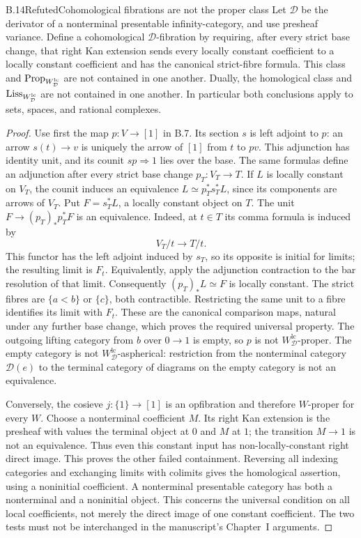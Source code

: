 \begin{claim}{B.14}{Refuted}{Cohomological fibrations are not the proper class}
Let $\mathcal D$ be the derivator of a nonterminal presentable
infinity-category, and use presheaf variance. Define a cohomological
$\mathcal D$-fibration by requiring, after every strict base change, that
right Kan extension sends every locally constant coefficient to a locally
constant coefficient and has the canonical strict-fibre formula.
This class and $\mathrm{Prop}_{W_{\mathcal D}^{\mathrm{lc}}}$ are not contained
in one another. Dually, the homological class and
$\mathrm{Liss}_{W_{\mathcal D}^{\mathrm{lc}}}$ are not contained in one another.
In particular both conclusions apply to sets, spaces, and rational complexes.
\end{claim}
\begin{proof}
Use first the map $p:V\to[1]$ in B.7. Its section $s$ is left adjoint to
$p$: an arrow $s(t)\to v$ is uniquely the arrow of $[1]$ from $t$ to $pv$.
This adjunction has identity unit, and its counit $sp\Rightarrow1$ lies
over the base. The same formulas define an adjunction after every strict
base change $p_T:V_T\to T$. If $L$ is locally constant on $V_T$, the
counit induces an equivalence $L\simeq p_T^*s_T^*L$, since its components
are arrows of $V_T$. Put $F=s_T^*L$, a locally constant object on $T$.
The unit $F\to(p_T)_*p_T^*F$ is an equivalence. Indeed, at $t\in T$
its comma formula is induced by
\[
 V_T/t\longrightarrow T/t.
\]
This functor has the left adjoint induced by $s_T$, so its opposite is
initial for limits; the resulting limit is $F_t$. Equivalently, apply
the adjunction contraction to the bar resolution of that limit.
Consequently $(p_T)_*L\simeq F$ is locally constant. The strict fibres
are $\{a<b\}$ or $\{c\}$, both contractible. Restricting the same
unit to a fibre identifies its limit with $F_t$. These are the canonical
comparison maps, natural under any further base change, which proves the
required universal property.
The outgoing lifting category from $b$ over $0\to1$ is empty, so $p$
is not $W_{\mathcal D}^{\mathrm{lc}}$-proper. The empty category is not
$W_{\mathcal D}^{\mathrm{lc}}$-aspherical: restriction from the
nonterminal category $\mathcal D(e)$ to the terminal category of diagrams
on the empty category is not an equivalence.

Conversely, the cosieve $j:\{1\}\to[1]$ is an opfibration and therefore
$W$-proper for every $W$. Choose a nonterminal coefficient $M$. Its right
Kan extension is the presheaf with values the terminal object at $0$ and
$M$ at $1$; the transition $M\to1$ is not an equivalence. Thus even this
constant input has non-locally-constant right direct image. This proves the
other failed containment. Reversing all indexing categories and exchanging
limits with colimits gives the homological assertion, using a noninitial
coefficient. A nonterminal presentable category has both a nonterminal and
a noninitial object.
This concerns the universal condition on all local coefficients, not merely
the direct image of one constant coefficient. The two tests must not be
interchanged in the manuscript's Chapter~I arguments.
\end{proof}

